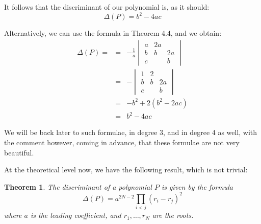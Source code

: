 \documentclass[12pt]{amsbook}
\newtheorem{theorem}{Theorem}[chapter]
\begin{document}
It follows that the discriminant of our polynomial is, as it should:
$$\Delta(P)=b^2-4ac$$

Alternatively, we can use the formula in Theorem 4.4, and we obtain:
\begin{eqnarray*}
\Delta(P)=
&=&-\frac{1}{a}\begin{vmatrix}
a&2a&\\
b&b&2a\\
c&&b
\end{vmatrix}\\
&=&-\begin{vmatrix}
1&2&\\
b&b&2a\\
c&&b
\end{vmatrix}\\
&=&-b^2+2(b^2-2ac)\\
&=&b^2-4ac
\end{eqnarray*}

We will be back later to such formulae, in degree 3, and in degree 4 as well, with the comment however, coming in advance, that these formulae are not very beautiful.

\bigskip

At the theoretical level now, we have the following result, which is not trivial:

\begin{theorem}
The discriminant of a polynomial $P$ is given by the formula
$$\Delta(P)=a^{2N-2}\prod_{i<j}(r_i-r_j)^2$$
where $a$ is the leading coefficient, and $r_1,\ldots,r_N$ are the roots.
\end{theorem}
\end{document}
